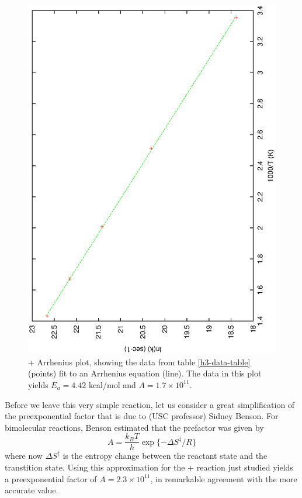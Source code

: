 \begin{figure}
\begin{center}
\includegraphics[scale=0.5,angle=270]{h2-h-arrhen.eps}
\end{center}
\caption{+ Arrhenius plot, showing the data from
table \ref{h3-data-table} (points) fit to an Arrhenius equation
(line). The data in this plot yields $E_a=4.42$ kcal/mol and
$A=1.7\times 10^{11}$.}
\label{h2-h-arrhen}
\end{figure}

Before we leave this very simple reaction, let us consider a great
simplification of the preexponential factor that is due to (USC
professor) Sidney Benson. For bimolecular reactions, Benson estimated
that the prefactor was given by
\begin{equation}
 A = \frac{k_BT}{h}\exp\{-\Delta S^\ddag/R\}
\end{equation}
where now $\Delta S^\ddag$ is the entropy change between the reactant
state and the transtition state. Using this approximation for the 
+ reaction just studied yields a preexponential
factor of $A = 2.3\times 10^{11}$, in remarkable agreement with the
more accurate value.

